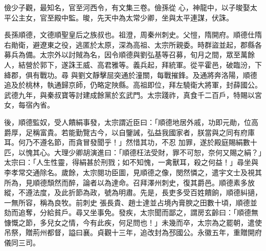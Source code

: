 \begin{pinyinscope}
 儉少子觀，最知名，官至河西令，有文集三卷。儉孫從
 心，神龍中，以子晙娶太平公主女，官至殿中監。晙，先天中為太常少卿，坐與太平連謀，伏誅。



 長孫順德，文德順聖皇后之族叔也。祖澄，周秦州刺史。父愷，隋開府。順德仕隋右勛衛，避遼東之役，逃匿於太原，深為高祖、太宗所親委。時群盜並起，郡縣各募兵為備。太宗外以討賊為名，因令順德與劉弘基等召募，旬月之間，眾至萬餘人，結營於郭下，遂誅王威、高君雅等。義兵起，拜統軍。從平霍邑，破臨汾，下絳郡，俱有戰功。尋
 與劉文靜擊屈突通於潼關，每戰摧鋒。及通將奔洛陽，順德追及於桃林，執通歸京師，仍略定陜縣。高祖即位，拜左驍衛大將軍，封薛國公。武德九年，與秦叔寶等討建成餘黨於玄武門。太宗踐祚，真食千二百戶，特賜以宮女，每宿內省。



 後，順德監奴，受人饋絹事發，太宗謂近臣曰：「順德地居外戚，功即元勛，位高爵厚，足稱富貴。若能勤覽古今，以自鑒誡，弘益我國家者，朕當與之同有府庫耳。何乃不遵名節，而貪冒發聞乎！」然惜其功，不忍
 加罪，遂於殿庭賜絹數十匹，以愧其心。大理少卿胡演進曰：「順德枉法受財，罪不可恕，奈何又賜之絹？」太宗曰：「人生性靈，得絹甚於刑戮；如不知愧，一禽獸耳，殺之何益！」尋坐與李孝常交通除名。歲餘，太宗閱功臣圖，見順德之像，閔然憐之，遣宇文士及視其所為，見順德頹然而醉，論者以為達命。召拜澤州刺史，復其爵邑。順德素多放縱，不遵法度，及此折節為政，號為明肅。先是，長吏多受百姓饋餉，順德糾擿，一無所容，稱為良牧。前刺史
 張長貴、趙士達並占境內膏腴之田數十頃，順德並劾而追奪，分給貧戶。尋又坐事免。發疾，太宗聞而鄙之，謂房玄齡曰：「順德無慷慨之節，多兒女之情，今有此疾，何足問也！」未幾而卒，太宗為之罷朝，遣使吊祭，贈荊州都督，謚曰襄。貞觀十三年，追改封為邳國公。永徽五年，重贈開府儀同三司。




\end{pinyinscope}

